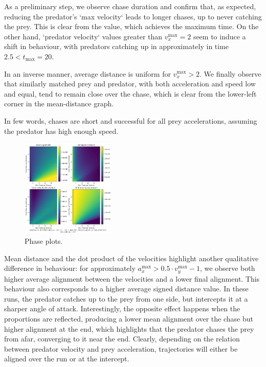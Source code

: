 \documentclass[11pt, twocolumn]{article}
\begin{document}
          As a preliminary step, we observe chase duration and confirm that, as expected, reducing the predator's `max velocity` leads to longer chases, up to never catching the prey. This is clear from the value, which achieves the maximum time. On the other hand, `predator velocity` values greater than $v_x^{\text{max}}=2$ seem to induce a shift in behaviour, with predators catching up in approximately in time $2.5 < t_{\text{max}} = 20$.

          In an inverse manner, average distance is uniform for $v_x^{\text{max}}>2$. We finally observe that similarly matched prey and predator, with both acceleration and speed low and equal, tend to remain close over the chase, which is clear from the lower-left corner in the mean-distance graph.

          In few words, chases are short and successful for all prey accelerations, assuming the predator has high enough speed.

          \begin{figure}[H]
            \centering
            \includegraphics[width=0.4\textwidth]{figures/phase_avg_dist_dot.png}
            \caption{Phase plots.}
            \label{fig:phaseplot2}
          \end{figure}

          Mean distance and the dot product of the velocities highlight another qualitative difference in behaviour: for approximately $a^{\text{max}}_x > 0.5\cdot v^{\text{max}}_y - 1$, we observe both higher average alignment between the velocities and a lower final alignment. This behaviour also corresponds to a higher average signed distance value. In these runs, the predator catches up to the prey from one side, but intercepts it at a sharper angle of attack. Interestingly, the opposite effect happens when the proportions are reflected, producing a lower mean alignment over the chase but higher alignment at the end, which highlights that the predator chases the prey from afar, converging to it near the end. Clearly, depending on the relation between predator velocity and prey acceleration, trajectories will either be aligned over the run or at the intercept.
\end{document}
